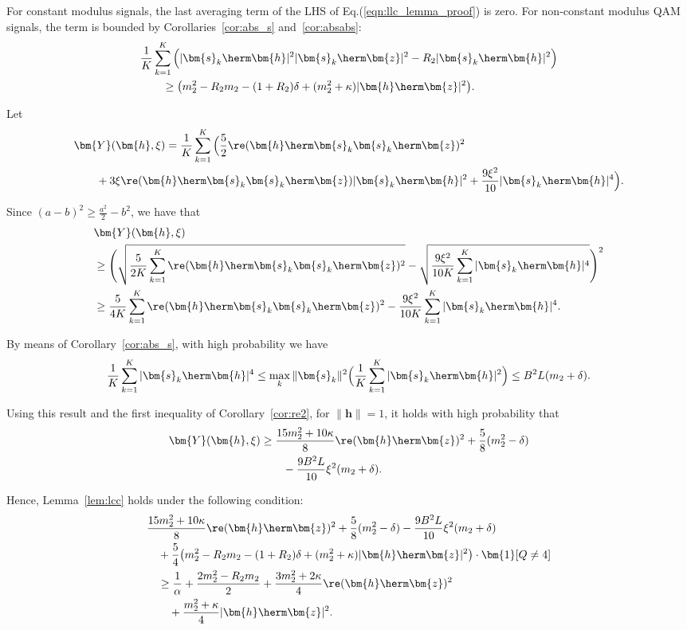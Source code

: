 For constant modulus signals, the last averaging term of the LHS of Eq.(\ref{eqn:llc_lemma_proof}) is zero. For non-constant modulus QAM signals, the term is bounded by Corollaries~\ref{cor:abs_s} and~\ref{cor:absabs}:
\begin{align}
	&\frac{1}{K}\sum_{k=1}^K\Big(|\bm{s}_k\herm\bm{h}|^2|\bm{s}_k\herm\bm{z}|^2-R_2|\bm{s}_k\herm\bm{h}|^2\Big)\nonumber\\
	&\qquad \geq\big( m_2^2-R_2m_2-(1+R_2)\delta+(m_2^2+\kappa)|\bm{h}\herm\bm{z}|^2\big).\nonumber
\end{align}

Let 
\begin{align}
	&\bm{Y}(\bm{h},\xi)=\frac{1}{K}\sum_{k=1}^K\Big(\frac{5}{2}\re(\bm{h}\herm\bm{s}_k\bm{s}_k\herm\bm{z})^2\nonumber\\
	&\qquad+3\xi\re(\bm{h}\herm\bm{s}_k\bm{s}_k\herm\bm{z})|\bm{s}_k\herm\bm{h}|^2+\frac{9\xi^2}{10}|\bm{s}_k\herm\bm{h}|^4\Big).\nonumber%
\end{align}

Since $(a-b)^2\geq\frac{a^2}{2}-b^2$, we have that
\begin{align}
	&\bm{Y}(\bm{h},\xi)\nonumber\\
	&\geq\Bigg(\sqrt{\frac{5}{2K}\sum_{k=1}^K\re(\bm{h}\herm\bm{s}_k\bm{s}_k\herm\bm{z})^2}-\sqrt{\frac{9\xi^2}{10K}\sum_{k=1}^K|\bm{s}_k\herm\bm{h}|^4}\Bigg)^2\nonumber\\
	&\geq \frac{5}{4K}\sum_{k=1}^K\re(\bm{h}\herm\bm{s}_k\bm{s}_k\herm\bm{z})^2-\frac{9\xi^2}{10K}\sum_{k=1}^K|\bm{s}_k\herm\bm{h}|^4.\nonumber%
\end{align}

By means of Corollary~\ref{cor:abs_s}, with high probability we have
\begin{align}
	\frac{1}{K}\sum_{k=1}^K|\bm{s}_k\herm\bm{h}|^4\leq\max_k\|\bm{s}_k\|^2\Big(\frac{1}{K}\sum_{k=1}^K|\bm{s}_k\herm\bm{h}|^2\Big)\leq B^2L(m_2+\delta).\nonumber
\end{align}

Using this result and the first inequality of Corollary~\ref{cor:re2}, for
$\|\bm{h}\|=1$, it holds with high probability that
\begin{align}
	\bm{Y}(\bm{h},\xi)&\geq\frac{15m_2^2+10\kappa}{8}\re(\bm{h}\herm\bm{z})^2+\frac{5}{8}(m_2^2-\delta)\nonumber\\
	&\quad\quad-\frac{9B^2L}{10}\xi^2(m_2+\delta).\nonumber
\end{align}

Hence, Lemma~\ref{lem:lcc} holds under the following condition:
\begin{align}
	&\frac{15 m_2^2+10\kappa}{8}\re(\bm{h}\herm\bm{z})^2+\frac{5}{8}(m_2^2-\delta)-\frac{9B^2L}{10}\xi^2(  m_2+\delta)\nonumber\\
	&\quad+\frac{5}{4}\big( m_2^2-R_2m_2-(1+R_2)\delta+(m_2^2+\kappa)|\bm{h}\herm\bm{z}|^2\big)\cdot\bm{1}[Q\neq 4] \nonumber\\
	&\quad\geq  \frac{1}{\alpha}+\frac{2m_2^2-R_2m_2}{2} +   \frac{3m_2^2+2\kappa}{4}\re(\bm{h}\herm\bm{z})^2
	\nonumber\\&\qquad
	+\frac{m_2^2+\kappa}{4}|\bm{h}\herm\bm{z}|^2.\label{eqn:lcc_alpha}
\end{align}

